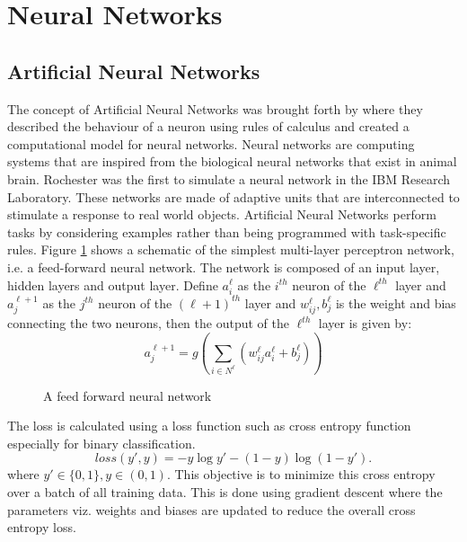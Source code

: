 \documentclass[fleqn,usenatbib]{mnras}
\begin{document}
\section{Neural Networks}
\subsection{Artificial Neural Networks}
\hspace{0.25 in}The concept of Artificial Neural Networks was brought forth by \citet{mcculloch1943logical} where they described the behaviour of a neuron using rules of calculus and created a computational model for neural networks. Neural networks are computing systems that are inspired from the biological neural networks that exist in animal brain. Rochester was the first to simulate a neural network in the IBM Research Laboratory. These networks are made of adaptive units that are interconnected to stimulate a response to real world objects. Artificial Neural Networks perform tasks by considering examples rather than being programmed with task-specific rules. Figure \ref{fig: ANN} shows a schematic of the simplest multi-layer perceptron network, i.e. a feed-forward neural network. The network is composed of an input layer, hidden layers and output layer. Define $a_i^\ell$ as the $i^{th}$ neuron of the $\ell^{th}$ layer and $a_j^{\ell+1}$ as the $j^{th}$ neuron of the $(\ell+1)^{th}$ layer and $w_{ij}^\ell, b_j^\ell$ is the weight and bias connecting the two neurons, then the output of the $\ell^{th}$ layer is given by:
\begin{equation}
    a^{\ell+1}_j = g(\sum_{i \in N^\ell}(w_{ij}^{\ell}a_i^{\ell} + b_j^{\ell}))
    \label{ANN_activation}
\end{equation}

\begin{figure}
    \centering
    
    \caption{A feed forward neural network}
    \label{fig: ANN}
\end{figure}
The loss is calculated using a loss function such as cross entropy function especially for binary classification.
\begin{equation}
    loss(y',y) = -y\log{y'} - (1-y)\log{(1-y')}.
    \label{ANN_loss}
\end{equation}
where $y' \in \{0,1\}, y \in (0,1)$. This objective is to minimize this cross entropy over a batch of all training data. This is done using gradient descent where the parameters viz. weights and biases are updated to reduce the overall cross entropy loss.
\end{document}

